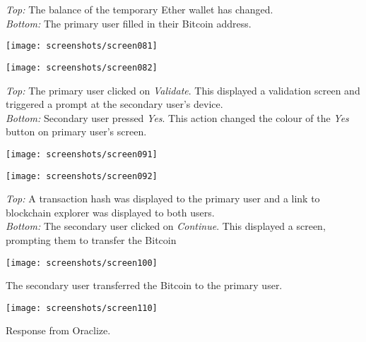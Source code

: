     \textit{Top:}    The balance of the temporary Ether wallet has changed.\\
    \textit{Bottom:} The primary user filled in their Bitcoin address.\\
    \centerline{\texttt{[image: screenshots/screen081]}}
    \centerline{\texttt{[image: screenshots/screen082]}}
    \textit{Top:}    The primary user clicked on \textit{Validate}. This displayed a validation screen and triggered a prompt at the secondary user's device.\\
    \textit{Bottom:} Secondary user pressed \textit{Yes}. This action changed the colour of the \textit{Yes} button on primary user's screen.\\
    \centerline{\texttt{[image: screenshots/screen091]}}
    \centerline{\texttt{[image: screenshots/screen092]}}
    \textit{Top:}    A transaction hash was displayed to the primary user and a link to blockchain explorer was displayed to both users.\\
    \textit{Bottom:} The secondary user clicked on \textit{Continue}. This displayed a screen, prompting them to transfer the Bitcoin\\    
    \centerline{\texttt{[image: screenshots/screen100]}}
    The secondary user transferred the Bitcoin to the primary user.\\
    \centerline{\texttt{[image: screenshots/screen110]}}
    Response from Oraclize.
    
